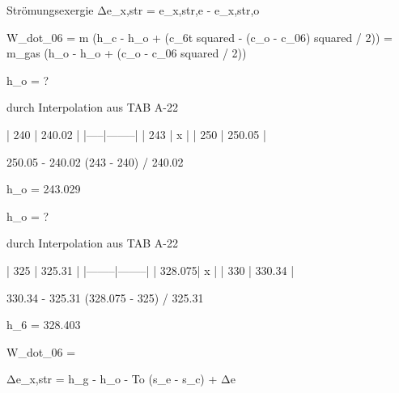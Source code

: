 Strömungsexergie Δe_x,str = e_x,str,e - e_x,str,o

W_dot_06 = m (h_c - h_o + (c_6t squared - (c_o - c_06) squared / 2))  
= m_gas (h_o - h_o + (c_o - c_06 squared / 2))

h_o = ?

durch Interpolation aus TAB A-22

| 240 | 240.02 |
|-----|--------|
| 243 | x      |
| 250 | 250.05 |

250.05 - 240.02
(243 - 240) / 240.02

h_o = 243.029

h_o = ?

durch Interpolation aus TAB A-22

| 325    | 325.31 |
|--------|--------|
| 328.075| x      |
| 330    | 330.34 |

330.34 - 325.31
(328.075 - 325) / 325.31

h_6 = 328.403

W_dot_06 =

Δe_x,str = h_g - h_o - To (s_e - s_c) + Δe